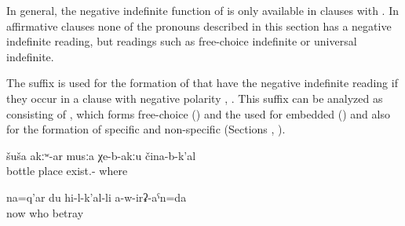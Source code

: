 In general, the negative indefinite function of  is only available in clauses with . In affirmative clauses none of the pronouns described in this section has a negative indefinite reading, but readings such as free-choice indefinite or universal indefinite. 

The suffix  is used for the formation of  that have the negative indefinite reading if they occur in a clause with negative polarity , . This suffix can be analyzed as consisting of , which forms free-choice  () and the  used for embedded  () and also for the formation of specific and non-specific  (Sections , ).
%
\begin{exe}
	\ex	\label{ex:There is no place where there are no bottles}
	\gll	šuša	akːʷ-ar	musːa	χe-b-akːu	čina-b-k'al\\
		bottle		place	exist.-	where\\
	\glt	{}

	\ex	\label{ex:Now nobody will betray me anymore}
	\gll	na=q'ar	du	hi-l-k'al-li	a-w-irʡ-aˁn=da\\
		now		who	betray\\
	\glt	{}
\end{exe}

